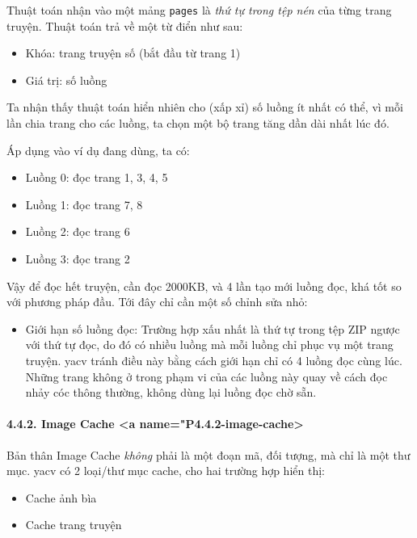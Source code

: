 \documentclass[
]{article}
\begin{document}
Thuật toán nhận vào một mảng \texttt{pages} là \emph{thứ tự trong tệp
nén} của từng trang truyện. Thuật toán trả về một từ điển như sau:

\begin{itemize}
\item
  Khóa: trang truyện số (bắt đầu từ trang 1)
\item
  Giá trị: số luồng
\end{itemize}

Ta nhận thấy thuật toán hiển nhiên cho (xấp xỉ) số luồng ít nhất có thể,
vì mỗi lần chia trang cho các luồng, ta chọn một bộ trang tăng dần dài
nhất lúc đó.

Áp dụng vào ví dụ đang dùng, ta có:

\begin{itemize}
\item
  Luồng 0: đọc trang 1, 3, 4, 5
\item
  Luồng 1: đọc trang 7, 8
\item
  Luồng 2: đọc trang 6
\item
  Luồng 3: đọc trang 2
\end{itemize}

Vậy để đọc hết truyện, cần đọc 2000KB, và 4 lần tạo mới luồng đọc, khá
tốt so với phương pháp đầu. Tới đây chỉ cần một số chỉnh sửa nhỏ:

\begin{itemize}
\item
  Giới hạn số luồng đọc: Trường hợp xấu nhất là thứ tự trong tệp ZIP
  ngược với thứ tự đọc, do đó có nhiều luồng mà mỗi luồng chỉ phục vụ
  một trang truyện. yacv tránh điều này bằng cách giới hạn chỉ có 4
  luồng đọc cùng lúc. Những trang không ở trong phạm vi của các luồng
  này quay về cách đọc nhảy cóc thông thường, không dùng lại luồng đọc
  chờ sẵn.
\end{itemize}

\hypertarget{image-cache-a-namep4.4.2-image-cache}{%
\paragraph{4.4.2. Image Cache \textless a
name="P4.4.2-image-cache\textgreater{}}\label{image-cache-a-namep4.4.2-image-cache}}

Bản thân Image Cache \emph{không} phải là một đoạn mã, đối tượng, mà chỉ
là một thư mục. yacv có 2 loại/thư mục cache, cho hai trường hợp hiển
thị:

\begin{itemize}
\item
  Cache ảnh bìa
\item
  Cache trang truyện
\end{itemize}
\end{document}
